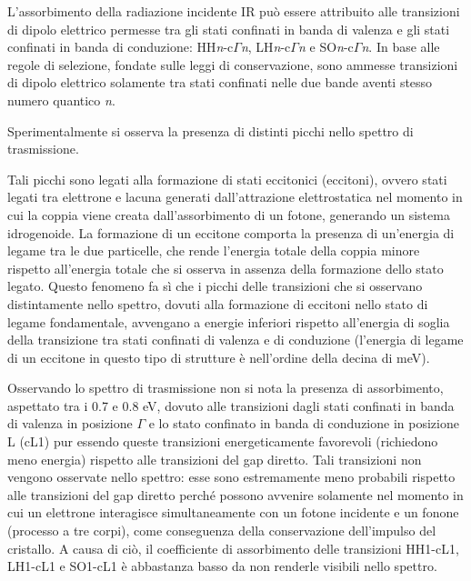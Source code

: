 \documentclass[journal]{IEEEtran}
\begin{document}


L'assorbimento della radiazione incidente IR può essere attribuito alle transizioni di dipolo elettrico permesse tra gli stati confinati in banda di valenza e gli stati confinati in banda di conduzione: HH\textit{n}-c$\Gamma$\textit{n}, LH\textit{n}-c$\Gamma$\textit{n} e SO\textit{n}-c$\Gamma$\textit{n}. In base alle regole di selezione, fondate sulle leggi di conservazione, sono ammesse transizioni di dipolo elettrico solamente tra stati confinati nelle due bande aventi stesso numero quantico \textit{n}.

Sperimentalmente si osserva la presenza di distinti picchi nello spettro di trasmissione.

Tali picchi sono legati alla formazione di stati eccitonici (eccitoni), ovvero stati legati tra elettrone e lacuna generati dall'attrazione elettrostatica nel momento in cui la coppia viene creata dall'assorbimento di un fotone, generando un sistema idrogenoide. La formazione di un eccitone comporta la presenza di un'energia di legame tra le due particelle, che rende l'energia totale della coppia minore rispetto all'energia totale che si osserva in assenza della formazione dello stato legato. Questo fenomeno fa sì che i picchi delle transizioni che si osservano distintamente nello spettro, dovuti alla formazione di eccitoni nello stato di legame fondamentale, avvengano a energie inferiori rispetto all'energia di soglia della transizione tra stati confinati di valenza e di conduzione (l'energia di legame di un eccitone in questo tipo di strutture è nell'ordine della decina di meV).

Osservando lo spettro di trasmissione non si nota la presenza di assorbimento, aspettato tra i 0.7 e 0.8 eV, dovuto alle transizioni dagli stati confinati in banda di valenza in posizione $\Gamma$ e lo stato confinato in banda di conduzione in posizione L (cL1) pur essendo queste transizioni energeticamente favorevoli (richiedono meno energia) rispetto alle transizioni del gap diretto. Tali transizioni non vengono osservate nello spettro: esse sono estremamente meno probabili rispetto alle transizioni del gap diretto perché possono avvenire solamente nel momento in cui un elettrone interagisce simultaneamente con un fotone incidente e un fonone (processo a tre corpi), come conseguenza della conservazione dell'impulso del cristallo.
A causa di ciò, il coefficiente di assorbimento delle transizioni HH1-cL1, LH1-cL1 e SO1-cL1 è abbastanza basso da non renderle visibili nello spettro.
\end{document}
